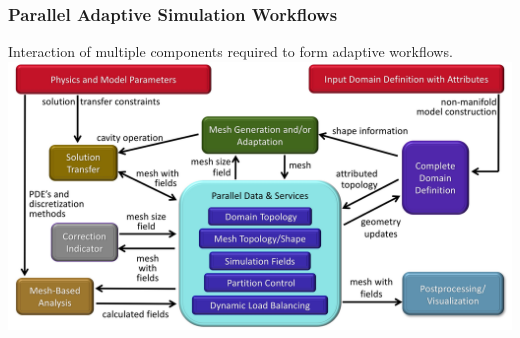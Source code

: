 \documentclass{beamer}
\begin{document}
\begin{frame} \frametitle{Parallel Adaptive Simulation Workflows} 
  Interaction of multiple components required to form adaptive workflows.\\
  \includegraphics[width=.95\textwidth]{../workflows/figures/workflowComponentInteractions.jpg}
\end{frame}
\end{document}
